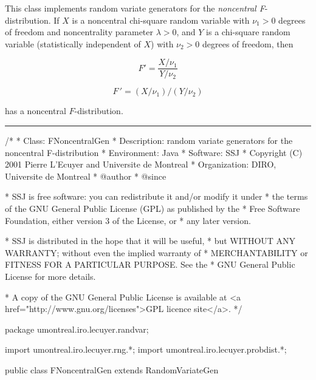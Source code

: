 
This class implements random variate generators for the 
\emph{noncentral F}-distribution.
If $X$ is a noncentral chi-square random variable with $\nu_1 > 0$ degrees of 
freedom and noncentrality parameter $\lambda > 0$, and $Y$ is a chi-square 
random variable (statistically independent of $X$) with $\nu_2>0$ degrees
 of freedom, then
\begin{latexonly}%
\[
             F' = \frac{X/\nu_1}{Y/\nu_2}
\]
\end{latexonly}%
\begin{htmlonly}%
\[
             F\,' = {(X/\nu_1)} / {(Y/\nu_2)}
\]
\end{htmlonly}%
has a noncentral $F$-distribution.


\bigskip\hrule

\begin{code}
\begin{hide}
/*
 * Class:        FNoncentralGen
 * Description:  random variate generators for the noncentral F-distribution
 * Environment:  Java
 * Software:     SSJ 
 * Copyright (C) 2001  Pierre L'Ecuyer and Universite de Montreal
 * Organization: DIRO, Universite de Montreal
 * @author       
 * @since

 * SSJ is free software: you can redistribute it and/or modify it under
 * the terms of the GNU General Public License (GPL) as published by the
 * Free Software Foundation, either version 3 of the License, or
 * any later version.

 * SSJ is distributed in the hope that it will be useful,
 * but WITHOUT ANY WARRANTY; without even the implied warranty of
 * MERCHANTABILITY or FITNESS FOR A PARTICULAR PURPOSE.  See the
 * GNU General Public License for more details.

 * A copy of the GNU General Public License is available at
   <a href="http://www.gnu.org/licenses">GPL licence site</a>.
 */
\end{hide}
package umontreal.iro.lecuyer.randvar;\begin{hide}
import umontreal.iro.lecuyer.rng.*;
import umontreal.iro.lecuyer.probdist.*;
\end{hide}

public class FNoncentralGen extends RandomVariateGen \begin{hide} {
   private ChiSquareNoncentralGen noncenchigen;
   private ChiSquareGen chigen;
   private double nu1;   // degrees of freedom of noncenchigen
   private int nu2;   // degrees of freedom of chigen

   public double nextDouble()  {
      double x = noncenchigen.nextDouble();
      double y = chigen.nextDouble();
      return (x * nu2) / (y * nu1);
   }
\end{hide}
\end{code}

